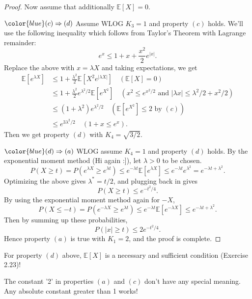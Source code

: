 \begin{proof}
Now assume that additionally $\mathbb{E}[X] = 0$. 

$\color{blue} (c) \Rightarrow (d)$ Assume WLOG $K_3 = 1$ and property $(c)$ holds. We'll use the following 
inequality which follows from Taylor's Theorem with Lagrange remainder: 
\[ e^x \leq 1 + x + \frac{x^2}{2}e^{|x|}. \]
Replace the above with $x = \lambda X$ and taking expectations, we get 
\begin{align*}
	\mathbb{E}[e^{\lambda X}] 
	&\leq 1 + \frac{\lambda^2}{2}\mathbb{E}[X^2 e^{|\lambda X|}] \quad (\mathbb{E}[X] = 0) \\
	&\leq 1 + \frac{\lambda^2}{2}e^{\lambda^2 / 2} \mathbb{E}[e^{X^2}] \quad 
	(x^2 \leq e^{x^2 / 2} \text{ and } |\lambda x| \leq \lambda^2 / 2 + x^2 / 2) \\
	&\leq (1 + \lambda^2)e^{\lambda^2 / 2} \quad (\mathbb{E}[e^{X^2}] \leq 2 \text{ by } (c)) \\
	&\leq e^{3 \lambda^2 / 2} \quad (1 + x \leq e^x).
\end{align*}
Then we get property $(d)$ with $K_4 = \sqrt{3/2}$.

$\color{blue} (d) \Rightarrow (a)$ WLOG assume $K_4 = 1$ and property $(d)$ holds. By the exponential 
moment method (Hi again :]), let $\lambda > 0$ to be chosen.
\[ P(X \geq t) = P(e^{\lambda X} \geq e^{\lambda t}) \leq e^{-\lambda t} \mathbb{E}[e^{\lambda X}] 
\leq e^{-\lambda t} e^{\lambda^2} = e^{-\lambda t + \lambda^2}. \]
Optimizing the above gives $\lambda^* = t/2$, and plugging back in gives 
\[ P(X \geq t) \leq e^{-t^2 / 4}. \]
By using the exponential moment method again for $-X$, 
\[ P(X \leq -t) = P(e^{-\lambda X} \geq e^{\lambda t}) 
\leq e^{-\lambda t} \mathbb{E}[e^{-\lambda X}] \leq e^{-\lambda t + \lambda^2}. \]
Then by summing up these probabilities, 
\[ P(|x| \geq t) \leq 2e^{-t^2 / 4}. \]
Hence property $(a)$ is true with $K_1 = 2$, and the proof is complete.
\end{proof}

\begin{remark}
\label{rmk:2.6.2}
For property $(d)$ above, $\mathbb{E}[X]$ is a necessary and sufficient condition (Exercise 2.23)!
\end{remark}

\begin{remark}
\label{rmk:2.6.3}
The constant '2' in properties $(a)$ and $(c)$ don't have any special meaning. Any absolute constant 
greater than 1 works!
\end{remark}


